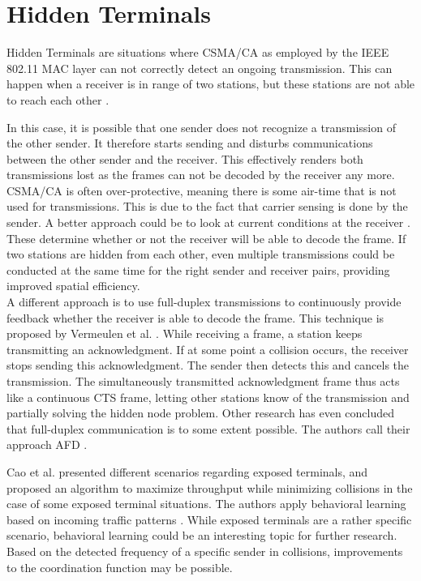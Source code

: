 
\section{Hidden Terminals}

Hidden Terminals are situations where \gls{CSMA/CA} as employed by the IEEE 802.11 \gls{MAC} layer can not correctly detect an ongoing transmission. This can happen when a receiver is in range of two stations, but these stations are not able to reach each other \cite{perahia2013}.

In this case, it is possible that one sender does not recognize a transmission of the other sender. It therefore starts sending and disturbs communications between the other sender and the receiver. This effectively renders both transmissions lost as the frames can not be decoded by the receiver any more.\\

\gls{CSMA/CA} is often over-protective, meaning there is some air-time that is not used for transmissions. This is due to the fact that carrier sensing is done by the sender. A better approach could be to look at current conditions at the receiver \cite{halperin2007}. These determine whether or not the receiver will be able to decode the frame. If two stations are hidden from each other, even multiple transmissions could be conducted at the same time for the right sender and receiver pairs, providing improved spatial efficiency.\\

A different approach is to use full-duplex transmissions to continuously provide feedback whether the receiver is able to decode the frame. This technique is proposed by Vermeulen et al. \cite{vermeulen2016}. While receiving a frame, a station keeps transmitting an acknowledgment. If at some point a collision occurs, the receiver stops sending this acknowledgment. The sender then detects this and cancels the transmission. The simultaneously transmitted acknowledgment frame thus acts like a continuous CTS frame, letting other stations know of the transmission and partially solving the hidden node problem. Other research has even concluded that full-duplex communication is to some extent possible. The authors call their approach \gls{AFD} \cite{lv2014}.

Cao et al. presented different scenarios regarding exposed terminals, and proposed an algorithm to maximize throughput while minimizing collisions in the case of some exposed terminal situations. The authors apply behavioral learning based on incoming traffic patterns \cite{cao2009}. While exposed terminals are a rather specific scenario, behavioral learning could be an interesting topic for further research. Based on the detected frequency of a specific sender in collisions, improvements to the coordination function may be possible.


